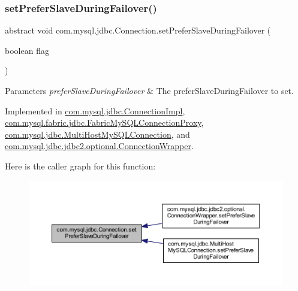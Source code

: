 \subsubsection{\texorpdfstring{set\+Prefer\+Slave\+During\+Failover()}{setPreferSlaveDuringFailover()}}
{\footnotesize\ttfamily abstract void com.\+mysql.\+jdbc.\+Connection.\+set\+Prefer\+Slave\+During\+Failover (\begin{DoxyParamCaption}\item[{boolean}]{flag }\end{DoxyParamCaption})\hspace{0.3cm}{\ttfamily [abstract]}}


\begin{DoxyParams}{Parameters}
{\em prefer\+Slave\+During\+Failover} & The prefer\+Slave\+During\+Failover to set. \\
\hline
\end{DoxyParams}


Implemented in \mbox{\hyperlink{classcom_1_1mysql_1_1jdbc_1_1_connection_impl_a419ce8a33f7efdabf8fd3a38b81e94a7}{com.\+mysql.\+jdbc.\+Connection\+Impl}}, \mbox{\hyperlink{classcom_1_1mysql_1_1fabric_1_1jdbc_1_1_fabric_my_s_q_l_connection_proxy_ae78251fc4c4ccc96fb198512bb035222}{com.\+mysql.\+fabric.\+jdbc.\+Fabric\+My\+S\+Q\+L\+Connection\+Proxy}}, \mbox{\hyperlink{classcom_1_1mysql_1_1jdbc_1_1_multi_host_my_s_q_l_connection_a87204976d451f0fa0c086fea3bc3be73}{com.\+mysql.\+jdbc.\+Multi\+Host\+My\+S\+Q\+L\+Connection}}, and \mbox{\hyperlink{classcom_1_1mysql_1_1jdbc_1_1jdbc2_1_1optional_1_1_connection_wrapper_a41e30138708f151589417be4f59e8c59}{com.\+mysql.\+jdbc.\+jdbc2.\+optional.\+Connection\+Wrapper}}.

Here is the caller graph for this function\+:\nopagebreak
\begin{figure}[H]
\begin{center}
\leavevmode
\includegraphics[width=350pt]{interfacecom_1_1mysql_1_1jdbc_1_1_connection_af8c0ed78ccafd6088266b19481b85ce6_icgraph}
\end{center}
\end{figure}
\mbox{\label{interfacecom_1_1mysql_1_1jdbc_1_1_connection_a94f38f8f7d8afd2a7bf6c87ad0d5d422}} 
